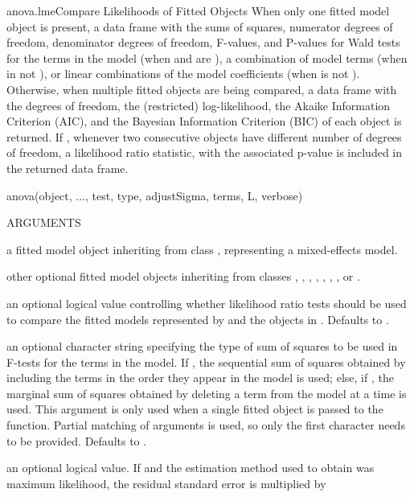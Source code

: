 \documentclass[pdftex]{article} \usepackage{url,graphicx}
\begin{document}
\begin{Helpfile}{anova.lme}{Compare Likelihoods of Fitted Objects}
When only one fitted model object is present, a data frame with the
sums of squares, numerator degrees of freedom, denominator degrees of
freedom, F-values, and P-values for Wald tests for the terms in the
model (when  and  are ), a combination
of model terms (when  in not ), or linear
combinations of the model coefficients (when  is not
). Otherwise, when multiple fitted objects are being
compared, a data frame with the degrees of freedom, the (restricted)
log-likelihood, the Akaike Information Criterion (AIC), and the
Bayesian Information Criterion (BIC) of each object is returned. If
, whenever two consecutive  objects have different
number of degrees of freedom, a likelihood ratio statistic, with the
associated p-value is included in the returned data frame.
\begin{Example}
anova(object, ..., test, type, adjustSigma, terms, L, verbose)
\end{Example}
\begin{Argument}{ARGUMENTS}
\item[\Co{object:}]
a fitted model object inheriting from class ,
representing a mixed-effects model.
\item[\Co{...:}]
other optional fitted model objects inheriting from
classes , , , ,
, , , or .
\item[\Co{test:}]
an optional logical value controlling whether likelihood
ratio tests should be used to compare the fitted models represented
by  and the objects in . Defaults to
.
\item[\Co{type:}]
an optional character string specifying the type of sum of
squares to be used in F-tests for the terms in the model. If 
, the sequential sum of squares obtained by
including the terms in the order they appear in the model is used;
else, if , the marginal sum of squares
obtained by deleting a term from the model at a time is used. This
argument is only used when a single fitted object is passed to the
function. Partial matching of arguments is used, so only the first
character needs to be provided. Defaults to .
\item[\Co{adjustSigma:}] an optional logical value. If  and
  the estimation method used to obtain  was maximum
  likelihood, the residual standard error is multiplied by

\end{Argument}
\end{Helpfile}
\end{document}
